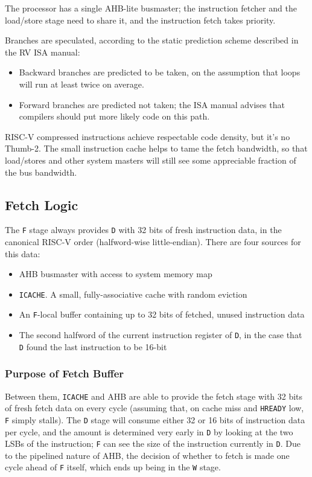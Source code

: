 \documentclass{article}
\begin{document}
The processor has a single AHB-lite busmaster; the instruction fetcher and the load/store stage need to share it, and the instruction fetch takes priority.

Branches are speculated, according to the static prediction scheme described in the RV ISA manual:

\begin{itemize}
\item Backward branches are predicted to be taken, on the assumption that loops will run at least twice on average.
\item Forward branches are predicted not taken; the ISA manual advises that compilers should put more likely code on this path.
\end{itemize}

RISC-V compressed instructions achieve respectable code density, but it's no Thumb-2. The small instruction cache helps to tame the fetch bandwidth, so that load/stores and other system masters will still see some appreciable fraction of the bus bandwidth.

\subsection{Fetch Logic}

The \texttt{F} stage always provides \texttt{D} with 32 bits of fresh instruction data, in the canonical RISC-V order (halfword-wise little-endian). There are four sources for this data:

\begin{itemize}
\item AHB busmaster with access to system memory map
\item \texttt{ICACHE}. A small, fully-associative cache with random eviction
\item An \texttt{F}-local buffer containing up to 32 bits of fetched, unused instruction data
\item The second halfword of the current instruction register of \texttt{D}, in the case that \texttt{D} found the last instruction to be 16-bit
\end{itemize}

\subsubsection{Purpose of Fetch Buffer}

Between them, \texttt{ICACHE} and AHB are able to provide the fetch stage with 32 bits of fresh fetch data on every cycle (assuming that, on cache miss and \texttt{HREADY} low, \texttt{F} simply stalls). The \texttt{D} stage will consume either 32 or 16 bits of instruction data per cycle, and the amount is determined very early in \texttt{D} by looking at the two LSBs of the instruction; \texttt{F} can see the size of the instruction currently in \texttt{D}. Due to the pipelined nature of AHB, the decision of whether to fetch is made one cycle ahead of \texttt{F} itself, which ends up being in the \texttt{W} stage.
\end{document}

